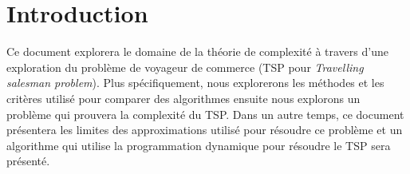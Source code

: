 \documentclass[../main.tex]{subfiles}
\begin{document}
\section{Introduction}
Ce document explorera le domaine de la théorie de complexité à travers d'une exploration du problème de voyageur de commerce (TSP pour \emph{Travelling salesman problem}). Plus spécifiquement, nous explorerons les méthodes et les critères utilisé pour comparer des algorithmes ensuite nous explorons un problème qui prouvera la complexité du TSP. Dans un autre temps, ce document présentera les limites des approximations utilisé pour résoudre ce problème et un algorithme qui utilise la programmation dynamique pour résoudre le TSP sera présenté.
\end{document}
